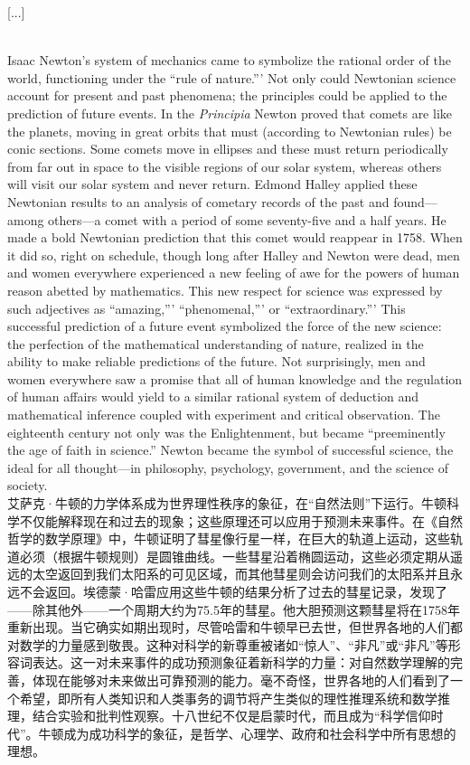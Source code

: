 \documentclass{article}
\begin{document}
\begin{center}
    [...]\\
\end{center}

\\
Isaac Newton's system of mechanics came to symbolize the rational order of the world, functioning under the ``rule of nature.''' Not only could Newtonian science account for present and past phenomena; the principles could be applied to the prediction of future events. In the \textit{Principia} Newton proved that comets are like the planets, moving in great orbits that must (according to Newtonian rules) be conic sections. Some comets move in ellipses and these must return periodically from far out in space to the visible regions of our solar system, whereas others will visit our solar system and never return. Edmond Halley applied these Newtonian results to an analysis of cometary records of the past and found—among others—a comet with a period of some seventy-five and a half years. He made a bold Newtonian prediction that this comet would reappear in 1758. When it did so, right on schedule, though long after Halley and Newton were dead, men and women everywhere experienced a new feeling of awe for the powers of human reason abetted by mathematics. This new respect for science was expressed by such adjectives as ``amazing,''' ``phenomenal,''' or ``extraordinary.''' This successful prediction of a future event symbolized the force of the new science: the perfection of the mathematical understanding of nature, realized in the ability to make reliable predictions of the future. Not surprisingly, men and women everywhere saw a promise that all of human knowledge and the regulation of human affairs would yield to a similar rational system of deduction and mathematical inference coupled with experiment and critical observation. The eighteenth century not only was the Enlightenment, but became ``preeminently the age of faith in science.'' Newton became the symbol of successful science, the ideal for all thought—in philosophy, psychology, government, and the science of society.\\
艾萨克·牛顿的力学体系成为世界理性秩序的象征，在“自然法则”下运行。牛顿科学不仅能解释现在和过去的现象；这些原理还可以应用于预测未来事件。在《自然哲学的数学原理》中，牛顿证明了彗星像行星一样，在巨大的轨道上运动，这些轨道必须（根据牛顿规则）是圆锥曲线。一些彗星沿着椭圆运动，这些必须定期从遥远的太空返回到我们太阳系的可见区域，而其他彗星则会访问我们的太阳系并且永远不会返回。埃德蒙·哈雷应用这些牛顿的结果分析了过去的彗星记录，发现了——除其他外——一个周期大约为75.5年的彗星。他大胆预测这颗彗星将在1758年重新出现。当它确实如期出现时，尽管哈雷和牛顿早已去世，但世界各地的人们都对数学的力量感到敬畏。这种对科学的新尊重被诸如“惊人”、“非凡”或“非凡”等形容词表达。这一对未来事件的成功预测象征着新科学的力量：对自然数学理解的完善，体现在能够对未来做出可靠预测的能力。毫不奇怪，世界各地的人们看到了一个希望，即所有人类知识和人类事务的调节将产生类似的理性推理系统和数学推理，结合实验和批判性观察。十八世纪不仅是启蒙时代，而且成为“科学信仰时代”。牛顿成为成功科学的象征，是哲学、心理学、政府和社会科学中所有思想的理想。\\
\end{document}
